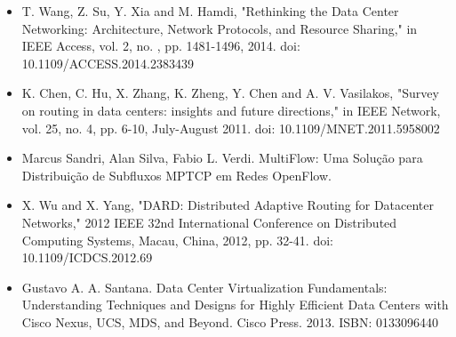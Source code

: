 \documentclass[12pt,a4paper]{report}
\begin{document}
\begin{itemize}
\item T. Wang, Z. Su, Y. Xia and M. Hamdi, "Rethinking the Data Center Networking: Architecture, Network Protocols, and Resource Sharing," in IEEE Access, vol. 2, no. , pp. 1481-1496, 2014. doi: 10.1109/ACCESS.2014.2383439
\item K. Chen, C. Hu, X. Zhang, K. Zheng, Y. Chen and A. V. Vasilakos, "Survey on routing in data centers: insights and future directions," in IEEE Network, vol. 25, no. 4, pp. 6-10, July-August 2011.
doi: 10.1109/MNET.2011.5958002
\item Marcus Sandri, Alan Silva, Fabio L. Verdi. MultiFlow: Uma Solução para Distribuição de Subfluxos MPTCP em Redes OpenFlow.
\item X. Wu and X. Yang, "DARD: Distributed Adaptive Routing for Datacenter Networks," 2012 IEEE 32nd International Conference on Distributed Computing Systems, Macau, China, 2012, pp. 32-41.
doi: 10.1109/ICDCS.2012.69
\item Gustavo A. A. Santana. Data Center Virtualization Fundamentals: Understanding Techniques and Designs for Highly Efficient Data Centers with Cisco Nexus, UCS, MDS, and Beyond. Cisco Press. 2013. ISBN: 0133096440
\end{itemize}
\end{document}
